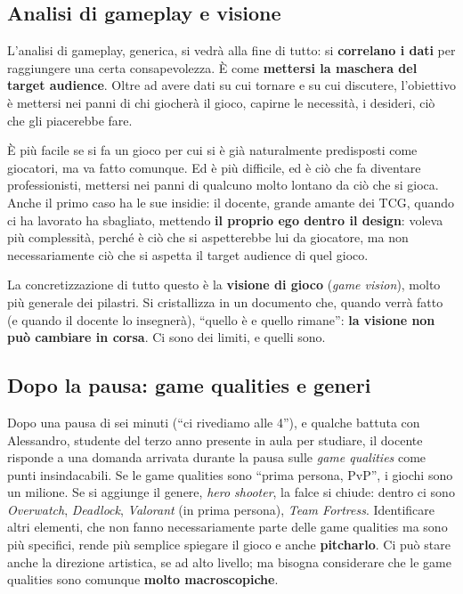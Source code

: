 \subsection{Analisi di gameplay e visione}

L'analisi di gameplay, generica, si vedrà alla fine di tutto: si
\textbf{correlano i dati} per raggiungere una certa consapevolezza. È come
\textbf{mettersi la maschera del target audience}. Oltre ad avere dati su cui
tornare e su cui discutere, l'obiettivo è mettersi nei panni di chi giocherà
il gioco, capirne le necessità, i desideri, ciò che gli piacerebbe fare.

È più facile se si fa un gioco per cui si è già naturalmente predisposti come
giocatori, ma va fatto comunque. Ed è più difficile, ed è ciò che fa
diventare professionisti, mettersi nei panni di qualcuno molto lontano da ciò
che si gioca. Anche il primo caso ha le sue insidie: il docente, grande amante
dei TCG, quando ci ha lavorato ha sbagliato, mettendo \textbf{il proprio ego
dentro il design}: voleva più complessità, perché è ciò che si aspetterebbe
lui da giocatore, ma non necessariamente ciò che si aspetta il target
audience di quel gioco.

La concretizzazione di tutto questo è la \textbf{visione di gioco} (\emph{game
vision}), molto più generale dei pilastri. Si cristallizza in un documento
che, quando verrà fatto (e quando il docente lo insegnerà), ``quello è e
quello rimane'': \textbf{la visione non può cambiare in corsa}. Ci sono dei
limiti, e quelli sono.

\subsection{Dopo la pausa: game qualities e generi}

Dopo una pausa di sei minuti (``ci rivediamo alle 4''), e qualche battuta con
Alessandro, studente del terzo anno presente in aula per studiare, il docente
risponde a una domanda arrivata durante la pausa sulle \emph{game qualities}
come punti insindacabili. Se le game qualities sono ``prima persona, PvP'',
i giochi sono un milione. Se si aggiunge il genere, \emph{hero shooter}, la
falce si chiude: dentro ci sono \emph{Overwatch}, \emph{Deadlock},
\emph{Valorant} (in prima persona), \emph{Team Fortress}. Identificare altri
elementi, che non fanno necessariamente parte delle game qualities ma sono
più specifici, rende più semplice spiegare il gioco e anche
\textbf{pitcharlo}. Ci può stare anche la direzione artistica, se ad alto
livello; ma bisogna considerare che le game qualities sono comunque
\textbf{molto macroscopiche}.

